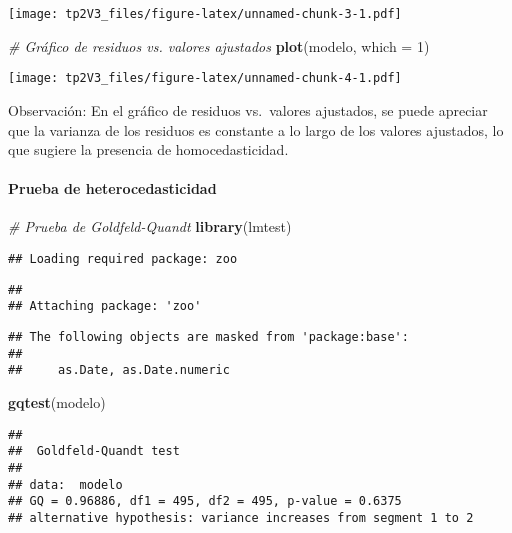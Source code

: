 \documentclass[
]{article}
\newenvironment{Shaded}{\begin{snugshade}}{\end{snugshade}}
\newcommand{\AttributeTok}[1]{\textcolor[rgb]{0.13,0.29,0.53}{#1}}
\newcommand{\CommentTok}[1]{\textcolor[rgb]{0.56,0.35,0.01}{\textit{#1}}}
\newcommand{\DecValTok}[1]{\textcolor[rgb]{0.00,0.00,0.81}{#1}}
\newcommand{\FunctionTok}[1]{\textcolor[rgb]{0.13,0.29,0.53}{\textbf{#1}}}
\newcommand{\NormalTok}[1]{#1}
\begin{document}
\texttt{[image: tp2V3\_files/figure-latex/unnamed-chunk-3-1.pdf]}

\begin{Shaded}
\begin{Highlighting}[]
\CommentTok{\# Gráfico de residuos vs. valores ajustados}
\FunctionTok{plot}\NormalTok{(modelo, }\AttributeTok{which =} \DecValTok{1}\NormalTok{)}
\end{Highlighting}
\end{Shaded}

\texttt{[image: tp2V3\_files/figure-latex/unnamed-chunk-4-1.pdf]}

Observación: En el gráfico de residuos vs.~valores ajustados, se puede
apreciar que la varianza de los residuos es constante a lo largo de los
valores ajustados, lo que sugiere la presencia de homocedasticidad.

\paragraph{Prueba de
heterocedasticidad}\label{prueba-de-heterocedasticidad}

\begin{Shaded}
\begin{Highlighting}[]
\CommentTok{\# Prueba de Goldfeld{-}Quandt}
\FunctionTok{library}\NormalTok{(lmtest)}
\end{Highlighting}
\end{Shaded}

\begin{verbatim}
## Loading required package: zoo
\end{verbatim}

\begin{verbatim}
## 
## Attaching package: 'zoo'
\end{verbatim}

\begin{verbatim}
## The following objects are masked from 'package:base':
## 
##     as.Date, as.Date.numeric
\end{verbatim}

\begin{Shaded}
\begin{Highlighting}[]
\FunctionTok{gqtest}\NormalTok{(modelo)}
\end{Highlighting}
\end{Shaded}

\begin{verbatim}
## 
##  Goldfeld-Quandt test
## 
## data:  modelo
## GQ = 0.96886, df1 = 495, df2 = 495, p-value = 0.6375
## alternative hypothesis: variance increases from segment 1 to 2
\end{verbatim}
\end{document}
